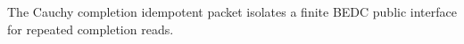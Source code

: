 The Cauchy completion idempotent packet isolates a finite BEDC public interface
for repeated completion reads.


